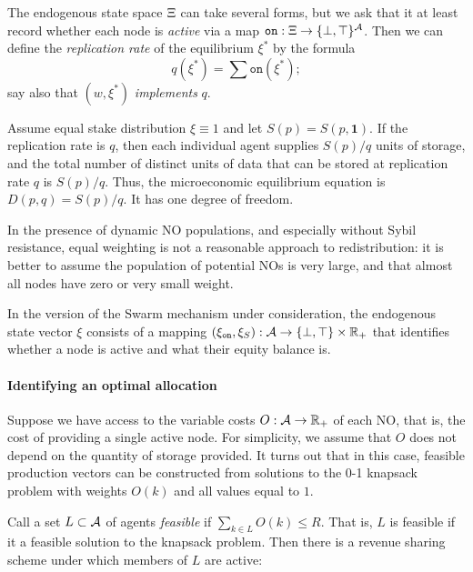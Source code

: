 The endogenous state space $\Xi$ can take several forms, but we ask that it at least record whether each node is \emph{active} via a map $\mathtt{on}:\Xi\rightarrow \{\bot,\top\}^{\mathcal{A}}$.
%
Then we can define the \emph{replication rate} of the equilibrium $\xi^*$ by the formula
\[
  q(\xi^*) = \sum\mathtt{on}(\xi^*);
\]
say also that $(w,\xi^*)$ \emph{implements} $q$.


\begin{example}

  Assume equal stake distribution $\xi \equiv 1$ and let $S(p)=S(p,\mathbf{1})$.
  If the replication rate is $q$, then each individual agent supplies $S(p)/q$ units of storage, and the total number of distinct units of data that can be stored at replication rate $q$ is $S(p)/q$.
  Thus, the microeconomic equilibrium equation is $D(p,q)=S(p)/q$.
  It has one degree of freedom.

  In the presence of dynamic NO populations, and especially without Sybil resistance, equal weighting is not a reasonable approach to redistribution: it is better to assume the population of potential NOs is very large, and that almost all nodes have zero or very small weight.

\end{example}

\begin{example}
  
  In the version of the Swarm mechanism under consideration, the endogenous state vector $\xi$ consists of a mapping $(\xi_\mathtt{on},\xi_S):\mathcal{A}\rightarrow \{\bot,\top\}\times\mathbb{R}_+$ that identifies whether a node is active and what their equity balance is.

\end{example}


\paragraph{Identifying an optimal allocation}
%
Suppose we have access to the variable costs $O:\mathcal{A}\rightarrow\mathbb{R}_+$ of each NO, that is, the cost of providing a single active node.
%
For simplicity, we assume that $O$ does not depend on the quantity of storage provided.
%
It turns out that in this case, feasible production vectors can be constructed from solutions to the 0-1 knapsack problem with weights $O(k)$ and all values equal to $1$.

Call a set $L\subset\mathcal{A}$ of agents \emph{feasible} if $\sum_{k\in L}O(k)\leq R$.
%
That is, $L$ is feasible if it a feasible solution to the knapsack problem.
%
Then there is a revenue sharing scheme under which members of $L$ are active:

